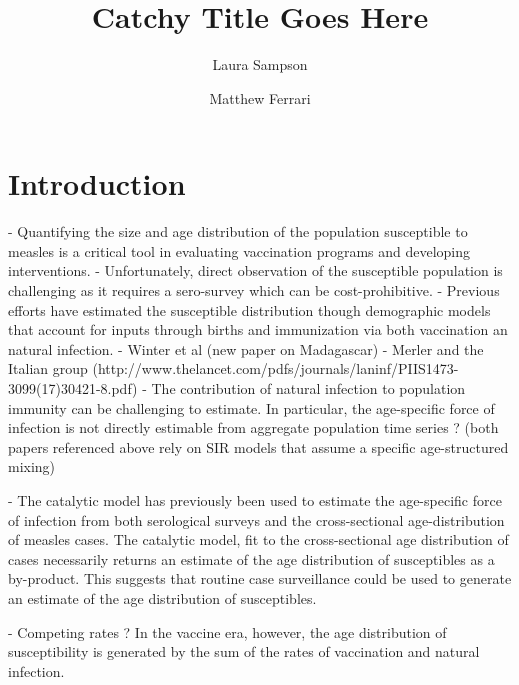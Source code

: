 \documentclass[nofootinbib,aps,pre,twocolumn,superscriptaddress,showkeys,showpacs]{revtex4-1}
\begin{document}
\title{Catchy Title Goes Here}
\author{Laura Sampson}
\author{Matthew Ferrari}

\begin{abstract}


\end{abstract}
\maketitle

\section{Introduction \label{sec:Intro}}
- Quantifying the size and age distribution of the population susceptible to measles is a critical tool in evaluating vaccination programs and developing interventions.  
- Unfortunately, direct observation of the susceptible population is challenging as it requires a sero-survey which can be cost-prohibitive.
- Previous efforts have estimated the susceptible distribution though demographic models that account for inputs through births and immunization via both vaccination an natural infection.
	- Winter et al (new paper on Madagascar)
	- Merler and the Italian group (http://www.thelancet.com/pdfs/journals/laninf/PIIS1473-3099(17)30421-8.pdf)
- The contribution of natural infection to population immunity can be challenging to estimate. In particular, the age-specific force of infection is not directly estimable from aggregate population time series ? (both papers referenced above rely on SIR models that assume a specific age-structured mixing) 

- The catalytic model has previously been used to estimate the age-specific force of infection from both serological surveys and the cross-sectional age-distribution of measles cases.  The catalytic model, fit to the cross-sectional age distribution of cases necessarily returns an estimate of the age distribution of susceptibles as a by-product.  This suggests that routine case surveillance could be used to generate an estimate of the age distribution of susceptibles.  

- Competing rates ? 
In the vaccine era, however, the age distribution of susceptibility is generated by the sum of the rates of vaccination and natural infection. 
\end{document}
